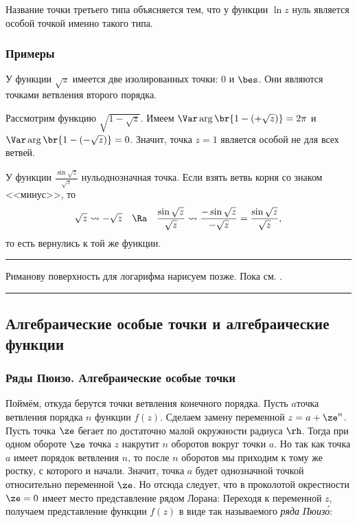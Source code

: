 \documentclass[a4paper]{article}
\newenvironment{petit}
{\par \smallskip \hrule \smallskip \footnotesize}
{\par \smallskip \hrule \smallskip}
\begin{document}
Название точки третьего типа объясняется тем, что у функции $\ln z$ нуль является особой точкой именно такого типа.

\subsubsection{Примеры}

\begin{ex}
У функции $\sqrt{z}$ имеется две изолированных точки: $0$ и $\bes$. Они являются точками ветвления второго порядка.
\end{ex}

\begin{ex}
Рассмотрим функцию $\sqrt{1-\sqrt{z}}$.
Имеем $\Var\arg \br{1- (+\sqrt z)}=2\pi$ и $\Var\arg \br{1-(-\sqrt z)}=0$. Значит, точка $z=1$ является особой
не для всех ветвей.
\end{ex}

\begin{ex} У функции $\frac{\sin\sqrt{z}}{\sqrt{z}}$ нуль\т однозначная точка. Если взять ветвь корня со знаком <<минус>>, то
$$\sqrt{z} \rightsquigarrow -\sqrt{z} \quad \Ra \quad
\frac{\sin\sqrt{z}}{\sqrt{z}} \rightsquigarrow \frac{-\sin\sqrt z }{-\sqrt z}=\frac{\sin\sqrt z}{\sqrt z},$$
то есть вернулись к той же функции.
\end{ex}

\begin{petit}
Риманову поверхность для логарифма нарисуем позже. Пока см. \cite[стр. 195]{shabat}.
\end{petit}

\subsection{Алгебраические особые точки и алгебраические функции}

\subsubsection{Ряды Пюизо. Алгебраические особые точки}

Поймём, откуда берутся точки ветвления конечного порядка.
Пусть $a$\т точка ветвления порядка $n$ функции $f(z)$. Сделаем замену переменной
$z = a + \ze^n$. Пусть точка $\ze$ бегает по достаточно малой окружности радиуса $\rh$.
Тогда при одном обороте $\ze$ точка $z$ накрутит $n$ оборотов вокруг точки $a$.
Но так как точка $a$ имеет порядок ветвления $n$, то после $n$ оборотов мы приходим к тому же
ростку, с которого и начали. Значит, точка $a$ будет однозначной точкой относительно переменной
$\ze$. Но отсюда следует, что в проколотой окрестности $\ze = 0$ имеет место представление рядом Лорана:
Переходя к переменной $z$, получаем представление функции $f(z)$ в виде так называемого \emph{ряда Пюиз\'о}:
\end{document}
